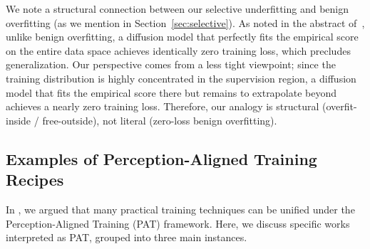 We note a structural connection between our selective underfitting and benign overfitting (as we mention in Section~\ref{sec:selective}). As noted in the abstract of~\citet{yoon2023diffusion}, unlike benign overfitting, a diffusion model that perfectly fits the empirical score on the entire data space achieves identically zero training loss, which precludes generalization. Our perspective comes from a less tight viewpoint; since the training distribution is highly concentrated in the supervision region, a diffusion model that fits the empirical score there but remains to extrapolate beyond achieves a nearly zero training loss. Therefore, our analogy is structural (overfit-inside / free-outside), not literal (zero-loss benign overfitting).


\subsection{Examples of Perception-Aligned Training Recipes} \label{app:pat-examples}

In , we argued that many practical training techniques can be unified under the Perception-Aligned Training (PAT) framework. Here, we discuss specific works interpreted as PAT, grouped into three main instances.


